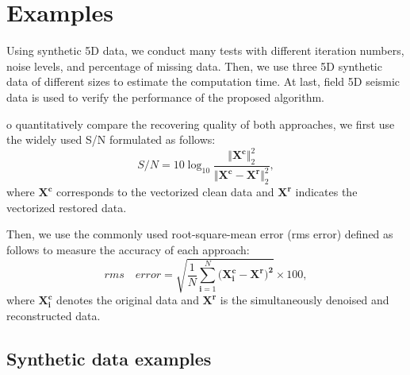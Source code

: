 \section{Examples}

Using  synthetic 5D data, we conduct many tests with different iteration numbers, noise levels, and percentage of missing data. Then, we use three 5D synthetic data of different sizes to estimate the computation time. At last, field 5D seismic data is used to verify the performance of the proposed algorithm.

o quantitatively compare the recovering quality of both approaches, we first use the widely used S/N \citep{chen2016simultaneous,zhang2017hybrid} formulated as follows:
\begin{equation}
S/N =10\log_{10}\frac{\Vert \mathbf{X^{c}} \Vert^2_2}{\Vert \mathbf{X^{c}}-\mathbf{X^{r}}\Vert^2_2},
\end{equation}
where $\mathbf{X^{c}}$ corresponds to the vectorized clean data and $\mathbf{X^{r}}$ indicates the vectorized restored data.

Then, we use the commonly used root-square-mean error (rms error) defined as follows to measure the accuracy of each approach:
\begin{equation}
rms\quad error={\sqrt{\frac{1}{N}\sum_{\mathbf{i}=1}^{N}(\mathbf{X^{c}_i-\mathbf{X^{r}})^2}}}\times100,
\end{equation}
where $\mathbf{X^{c}_i}$ denotes the original data and $\mathbf{X^{r}}$ is the simultaneously denoised and reconstructed data.


\subsection{Synthetic data examples}

